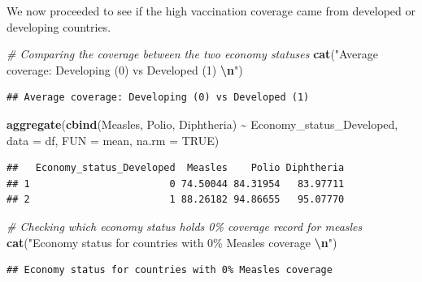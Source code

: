 \documentclass[
  10pt,
]{article}
\newenvironment{Shaded}{\begin{snugshade}}{\end{snugshade}}
\newcommand{\AttributeTok}[1]{\textcolor[rgb]{0.13,0.29,0.53}{#1}}
\newcommand{\CommentTok}[1]{\textcolor[rgb]{0.56,0.35,0.01}{\textit{#1}}}
\newcommand{\ConstantTok}[1]{\textcolor[rgb]{0.56,0.35,0.01}{#1}}
\newcommand{\DecValTok}[1]{\textcolor[rgb]{0.00,0.00,0.81}{#1}}
\newcommand{\FunctionTok}[1]{\textcolor[rgb]{0.13,0.29,0.53}{\textbf{#1}}}
\newcommand{\NormalTok}[1]{#1}
\newcommand{\SpecialCharTok}[1]{\textcolor[rgb]{0.81,0.36,0.00}{\textbf{#1}}}
\newcommand{\StringTok}[1]{\textcolor[rgb]{0.31,0.60,0.02}{#1}}
\begin{document}
We now proceeded to see if the high vaccination coverage came from
developed or developing countries.\\

\begin{Shaded}
\begin{Highlighting}[]
\CommentTok{\# Comparing the coverage between the two economy statuses}
\FunctionTok{cat}\NormalTok{(}\StringTok{"Average coverage: Developing (0) vs Developed (1) }\SpecialCharTok{\textbackslash{}n}\StringTok{"}\NormalTok{)}
\end{Highlighting}
\end{Shaded}

\begin{verbatim}
## Average coverage: Developing (0) vs Developed (1)
\end{verbatim}

\begin{Shaded}
\begin{Highlighting}[]
\FunctionTok{aggregate}\NormalTok{(}\FunctionTok{cbind}\NormalTok{(Measles, Polio, Diphtheria) }\SpecialCharTok{\textasciitilde{}}\NormalTok{ Economy\_status\_Developed, }\AttributeTok{data =}\NormalTok{ df, }\AttributeTok{FUN =}\NormalTok{ mean, }\AttributeTok{na.rm =} \ConstantTok{TRUE}\NormalTok{)}
\end{Highlighting}
\end{Shaded}

\begin{verbatim}
##   Economy_status_Developed  Measles    Polio Diphtheria
## 1                        0 74.50044 84.31954   83.97711
## 2                        1 88.26182 94.86655   95.07770
\end{verbatim}

\begin{Shaded}
\begin{Highlighting}[]
\CommentTok{\# Checking which economy status holds 0\% coverage record for measles}
\FunctionTok{cat}\NormalTok{(}\StringTok{"Economy status for countries with 0\% Measles coverage }\SpecialCharTok{\textbackslash{}n}\StringTok{"}\NormalTok{)}
\end{Highlighting}
\end{Shaded}

\begin{verbatim}
## Economy status for countries with 0% Measles coverage
\end{verbatim}

\begin{Shaded}
\end{Shaded}
\end{document}
